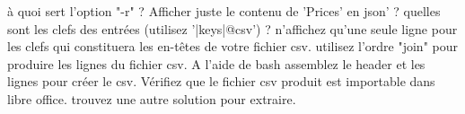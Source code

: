 \begin{questions}
       \question à quoi sert l'option "-r" ?
       \question Afficher juste le contenu de 'Prices' en json' ?
       \question quelles sont les clefs des entrées (utilisez '|keys|@csv') ?
       \question n'affichez qu'une seule ligne pour les clefs qui constituera les en-têtes de votre fichier csv.
       \question utilisez l'ordre "join" pour produire les lignes du fichier csv.
       \question A l'aide de bash assemblez le header et les lignes pour créer le csv. Vérifiez que le fichier csv produit est importable dans libre office.
       \question trouvez une autre solution pour extraire.

       
       
       
       
       
       
       
       

\end{questions}
